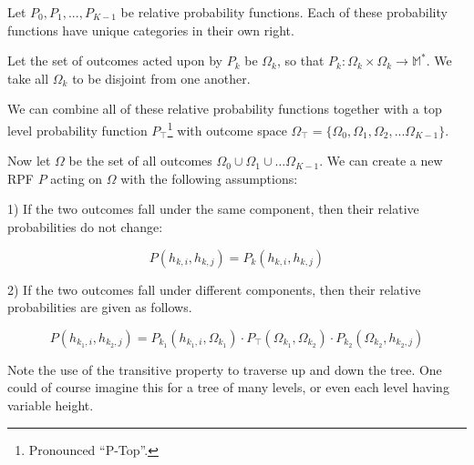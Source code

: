 \documentclass[twoside]{article}
\newcommand{\quotes}[1]{``#1''}
\theoremstyle{plain}%
\theoremstyle{definition}
\theoremstyle{remark}
\begin{document}
Let \(P_0, P_1, ..., P_{K-1}\) be relative probability functions. Each of these probability functions have unique categories in their own right.

Let the set of outcomes acted upon by \(P_k\) be \(\Omega_k\), so that \(P_k: \Omega_k \times \Omega_k \rightarrow \mathbb{M}^{\ast}\). We take all \(\Omega_k\) to be disjoint from one another.

We can combine all of these relative probability functions together with a top level probability function \(P_\top\)\footnote{Pronounced \quotes{P-Top}.} with outcome space \(\Omega_\top = \{\Omega_0, \Omega_1, \Omega_2, ... \Omega_{K- 1}\}\).


Now let \(\Omega\) be the set of all outcomes \(\Omega_0 \cup \Omega_1 \cup \dots \Omega_{K-1}\). We can create a new RPF \(P\) acting on \(\Omega\) with the following assumptions:

1) If the two outcomes fall under the same component, then their relative probabilities do not change:

\begin{equation}
\label{rpf_composition_same_branch}
P(h_{k, i}, h_{k, j}) = P_k(h_{k, i}, h_{k, j})
\end{equation}

2) If the two outcomes fall under different components, then their relative probabilities are given as follows.

\begin{equation}
\label{rpf_composition_different_branch}
P(h_{k_1, i}, h_{k_2, j}) = P_{k_1}(h_{k_1, i}, \Omega_{k_1}) \cdot  P_{\top}(\Omega_{k_1}, \Omega_{k_2}) \cdot P_{k_2}(\Omega_{k_2}, h_{k_2, j})
\end{equation}

Note the use of the transitive property to traverse up and down the tree. One could of course imagine this for a tree of many levels, or even each level having variable height.
\end{document}
